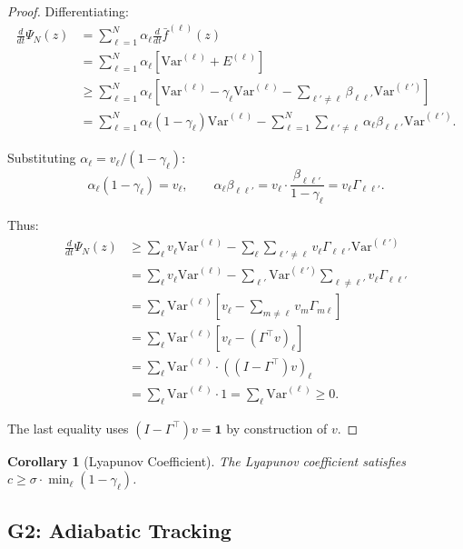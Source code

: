 \documentclass[12pt]{article}
\newtheorem{corollary}[theorem]{Corollary}
\newcommand{\Var}{\mathrm{Var}}
\begin{document}
\begin{proof}
Differentiating:
\begin{align*}
\frac{d}{dt} \Psi_N(z) &= \sum_{\ell=1}^N \alpha_\ell \frac{d}{dt} \bar{f}^{(\ell)}(z) \\
&= \sum_{\ell=1}^N \alpha_\ell \left[ \Var^{(\ell)} + E^{(\ell)} \right] \\
&\geq \sum_{\ell=1}^N \alpha_\ell \left[ \Var^{(\ell)} - \gamma_\ell \Var^{(\ell)} - \sum_{\ell' \neq \ell} \beta_{\ell\ell'} \Var^{(\ell')} \right] \\
&= \sum_{\ell=1}^N \alpha_\ell (1 - \gamma_\ell) \Var^{(\ell)} - \sum_{\ell=1}^N \sum_{\ell' \neq \ell} \alpha_\ell \beta_{\ell\ell'} \Var^{(\ell')}.
\end{align*}

Substituting $\alpha_\ell = v_\ell / (1 - \gamma_\ell)$:
\[
\alpha_\ell (1 - \gamma_\ell) = v_\ell, \qquad \alpha_\ell \beta_{\ell\ell'} = v_\ell \cdot \frac{\beta_{\ell\ell'}}{1 - \gamma_\ell} = v_\ell \Gamma_{\ell\ell'}.
\]

Thus:
\begin{align*}
\frac{d}{dt} \Psi_N(z) &\geq \sum_{\ell} v_\ell \Var^{(\ell)} - \sum_{\ell} \sum_{\ell' \neq \ell} v_\ell \Gamma_{\ell\ell'} \Var^{(\ell')} \\
&= \sum_{\ell} v_\ell \Var^{(\ell)} - \sum_{\ell'} \Var^{(\ell')} \sum_{\ell \neq \ell'} v_\ell \Gamma_{\ell\ell'} \\
&= \sum_{\ell} \Var^{(\ell)} \left[ v_\ell - \sum_{m \neq \ell} v_m \Gamma_{m\ell} \right] \\
&= \sum_{\ell} \Var^{(\ell)} \left[ v_\ell - (\Gamma^\top v)_\ell \right] \\
&= \sum_{\ell} \Var^{(\ell)} \cdot ((I - \Gamma^\top) v)_\ell \\
&= \sum_{\ell} \Var^{(\ell)} \cdot 1 = \sum_{\ell} \Var^{(\ell)} \geq 0.
\end{align*}

The last equality uses $(I - \Gamma^\top) v = \mathbf{1}$ by construction of $v$.
\end{proof}

\begin{corollary}[Lyapunov Coefficient]
\label{cor:lyap-coeff}
The Lyapunov coefficient satisfies $c \geq \sigma \cdot \min_\ell (1 - \gamma_\ell)$.
\end{corollary}

\subsection{G2: Adiabatic Tracking}
\end{document}
